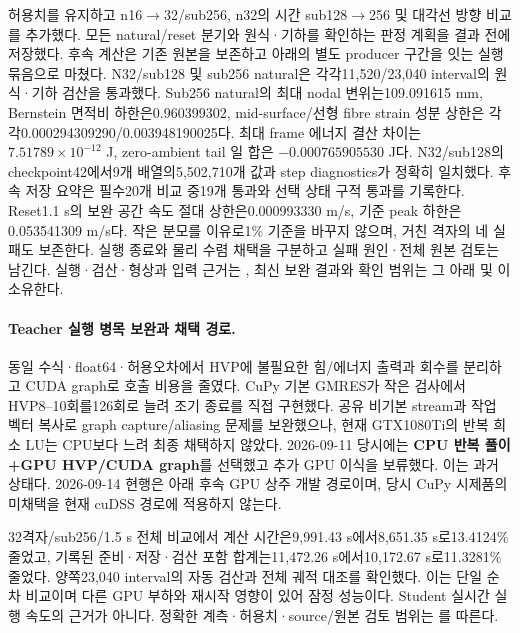 \documentclass[10pt]{article}
\begin{document}
허용치를 유지하고 n16$\to$32/sub256, n32의 시간 sub128$\to$256 및 대각선 방향 비교를
추가했다. 모든 natural/reset 분기와 원식·기하를 확인하는 판정 계획을 결과 전에 저장했다.
후속 계산은 기존 원본을 보존하고 아래의 별도 producer 구간을 잇는 실행 묶음으로 마쳤다.
N32/sub128 및 sub256 natural은 각각11,520/23,040 interval의 원식·기하 검산을 통과했다.
Sub256 natural의 최대 nodal 변위는109.091615 mm, Bernstein 면적비 하한은0.960399302,
mid-surface/선형 fibre strain 성분 상한은 각각0.000294309290/0.003948190025다.
최대 frame 에너지 결산 차이는 \(7.51789\times10^{-12}\) J, zero-ambient tail 일 합은
\(-0.000765905530\) J다. N32/sub128의 checkpoint42에서9개 배열의5,502,710개 값과
step diagnostics가 정확히 일치했다.
후속 저장 요약은 필수20개 비교 중19개 통과와 선택 상태 구적 통과를 기록한다.
Reset1.1 s의 보완 공간 속도 절대 상한은0.000993330 m/s, 기준 peak 하한은0.053541309 m/s다.
작은 분모를 이유로1\% 기준을 바꾸지 않으며, 거친 격자의 네 실패도 보존한다.
실행 종료와 물리 수렴 채택을 구분하고 실패 원인·전체 원본 검토는 남긴다.
실행·검산·형상과 입력 근거는
,
최신 보완 결과와 확인 범위는 그 아래  및
이 소유한다.

\paragraph{Teacher 실행 병목 보완과 채택 경로.}
\label{sec:r1-teacher-execution-cost}
동일 수식·float64·허용오차에서 HVP에 불필요한 힘/에너지 출력과 회수를 분리하고 CUDA graph로
호출 비용을 줄였다. CuPy 기본 GMRES가 작은 검사에서 HVP8--10회를126회로 늘려 조기 종료를
직접 구현했다. 공유 비기본 stream과 작업 벡터 복사로 graph capture/aliasing 문제를 보완했으나,
현재 GTX1080Ti의 반복 희소 LU는 CPU보다 느려 최종 채택하지 않았다.
2026-09-11 당시에는 \textbf{CPU 반복 풀이+GPU HVP/CUDA graph}를 선택했고 추가 GPU 이식을 보류했다.
이는 과거 상태다. 2026-09-14 현행은 아래 후속 GPU 상주 개발 경로이며, 당시 CuPy 시제품의 미채택을 현재 cuDSS 경로에 적용하지 않는다.

32격자/sub256/1.5 s 전체 비교에서 계산 시간은9,991.43 s에서8,651.35 s로13.4124\% 줄었고,
기록된 준비·저장·검산 포함 합계는11,472.26 s에서10,172.67 s로11.3281\% 줄었다.
양쪽23,040 interval의 자동 검산과 전체 궤적 대조를 확인했다. 이는 단일 순차 비교이며
다른 GPU 부하와 재시작 영향이 있어 잠정 성능이다. Student 실시간 실행 속도의 근거가 아니다.
정확한 계측·허용치·source/원본 검토 범위는
를 따른다.
\end{document}
